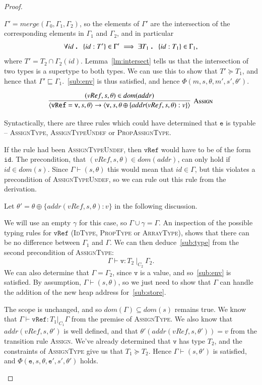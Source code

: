 \documentclass[12pt,a4paper,twoside,openright]{report}
\theoremstyle{definition}
\theoremstyle{dotless}
\newcommand{\transition}[6]{\langle{}\mathtt{#1},#2,#3\rangle{}\rightarrow{}\langle{}\mathtt{#4},#5,#6\rangle}
\newcommand\qdot{\mathbin{\scalebox{1.5}{.}}\enspace}
\begin{document}
\begin{proof}
\begin{case}[If2]
	$\Gamma'=merge(\Gamma_0,\Gamma_1,\Gamma_2)$, so the elements of $\Gamma'$
	are the intersection of the corresponding elements in $\Gamma_1$ and
	$\Gamma_2$, and in particular 
	$$\forall id\qdot \{id:T'\}\in\Gamma'\implies \exists T_1 \qdot \{id:T_1\}\in\Gamma_1,$$
   	where $T' =	T_2\cap\Gamma_2(id)$. Lemma~\ref{lm:intersect} tells us that the
	intersection of two types is a supertype to both types. We can use this to
	show that $T'\succeq T_1$, and hence that $\Gamma'\sqsubseteq\Gamma_1$.~\eqref{sub:env} is thus satisfied,
	and hence $\Phi(m,s,\theta,m',s',\theta')$.

  \end{case}

  \begin{case}[Assign]
	$$\infer[\textsc{Assign}]{
	  \transition{vRef = v}{s}{\theta}{v}{s}{\theta\oplus\{addr(vRef, s, \theta): v\}}	
	}{
		(vRef, s, \theta)\in dom(addr)	
	}$$

	Syntactically, there are three rules which could have determined that
	$\mathtt{e}$ is typable -- \textsc{AssignType}, \textsc{AssignTypeUndef} or
	\textsc{PropAssignType}. 
	
	If the rule had been \textsc{AssignTypeUndef}, then $\mathtt{vRef}$ would
	have to be of the form $\mathtt{id}$. The precondition, that $(vRef,s,
	\theta)\in dom(addr)$, can only hold if $id\in dom(s)$. Since
	$\Gamma\vdash(s,\theta)$ this would mean that $id\in\Gamma$, but this
	violates a precondition of \textsc{AssignTypeUndef}, so we can rule out
	this rule from the derivation.
  
	Let $\theta'=\theta\oplus\{addr(vRef,s,\theta):v\}$ in the following discussion.

	\begin{subcase}[AssignType]
	  We will use an empty $\gamma$ for this case, so $\Gamma\!\cup\!\gamma=\Gamma$.
	  An inspection of the possible typing rules for $\mathtt{vRef}$
	  (\textsc{IdType, PropType} or \textsc{ArrayType}), shows that there can
	  be no difference between $\Gamma_1$ and $\Gamma$.
	  We can then deduce~\eqref{sub:type} from the second precondition of \textsc{AssignType}:
	  $$\Gamma\vdash\mathtt{v}:T_2\ |_{C_2}\ \Gamma_2.$$ 
	  We can also determine that $\Gamma=\Gamma_2$, since $\mathtt{v}$ is a value, and
	  so~\eqref{sub:env} is satisfied. By assumption, $\Gamma\vdash(s,\theta)$, so
	   we just need to show that
	  $\Gamma$ can handle the addition of the new heap address for~\eqref{sub:store}.

 	  The scope is unchanged, and so $dom(\Gamma)\subseteq dom(s)$ remains true.
	  We know that $\Gamma\vdash\mathtt{vRef}:T_1|_{C_1}\Gamma$ from the premise of 
	  \textsc{AssignType}. We also know that $addr(vRef, s, \theta')$ is 
	  well defined, and that $\theta'(addr(vRef, s, \theta')) = v$ 
	  from the transition rule \textsc{Assign}. We've already determined
	  that $\mathtt{v}$ has type $T_2$, and the constraints of \textsc{AssignType}
	  give us that $T_1\succeq T_2$. Hence $\Gamma\vdash(s,\theta')$ is satisfied,
	  and $\Phi(\mathtt{e},s,\theta,\mathtt{e'},s',\theta')$ holds.
  	\end{subcase}


\end{case}
\end{proof}
\end{document}
